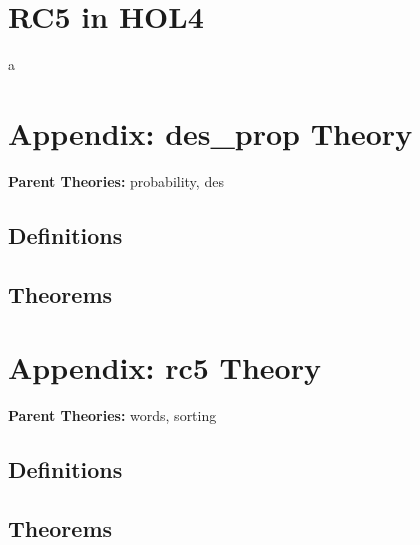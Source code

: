 \documentclass{article}
\begin{document}
\section{RC5 in HOL4}
a





\section*{Appendix: des\_prop Theory}
\begin{flushleft}
\textbf{Parent Theories:} probability, des
\end{flushleft}


\subsection{Definitions}

\HOLdesXXpropDefinitions

\subsection{Theorems}

\HOLdesXXpropTheorems

\section{Appendix: rc5 Theory}
\begin{flushleft}
\textbf{Parent Theories:} words, sorting
\end{flushleft}


\subsection{Definitions}

\HOLrcFiveDefinitions

\subsection{Theorems}

\HOLrcFiveTheorems
\end{document}
